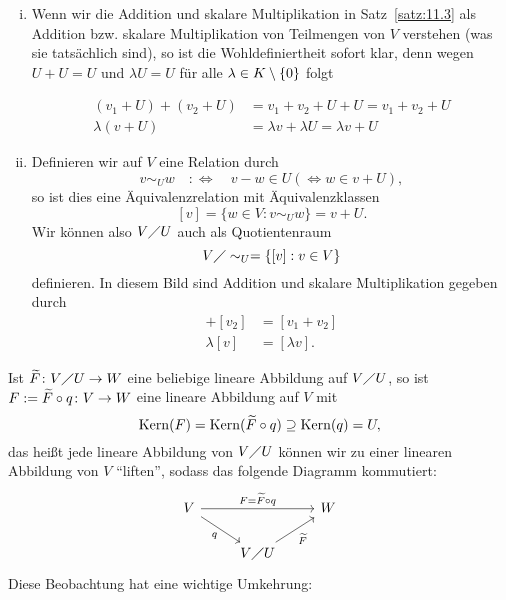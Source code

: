 \begin{bemerkung}
	\label{bem:11.4}
	\begin{enumerate}[(i)]
		\item Wenn wir die Addition und skalare Multiplikation in Satz~\ref{satz:11.3} als Addition bzw. skalare Multiplikation von Teilmengen von $V$ verstehen (was sie tatsächlich sind), so ist die Wohldefiniertheit sofort klar, denn wegen $U+U = U$ und $\lambda U = U$ für alle $\lambda \in K \setminus \{0\}$ folgt
		
		\begin{align*}
			(v_1+U)+(v_2+U) &= v_1+v_2+U+U = v_1 + v_2 + U \\
			\lambda(v+U) &= \lambda v + \lambda U = \lambda v + U
		\end{align*}
		
		\item Definieren wir auf $V$ eine Relation durch
		\[
			v \sim_U w \quad :\Leftrightarrow \quad v-w \in U (\Leftrightarrow w \in v+U),
		\]
		so ist dies eine Äquivalenzrelation mit Äquivalenzklassen 
		\[
			[v] = \{w \in V : v \sim_U w\} = v + U.
		\]
		Wir können also $V \diagup U$ auch als Quotientenraum
		\[
			V \diagup \sim_U = \{ [v] : v \in V\}
		\]
		definieren.
		In diesem Bild sind Addition und skalare Multiplikation gegeben durch
		\begin{align*}
			[v_1] + [v_2] &= [v_1 + v_2] \\
			\lambda [v] &= [\lambda v].
		\end{align*}
	\end{enumerate}
\end{bemerkung}

\begin{bemerkung}
	\label{bem:11.5}
	Ist $\widetilde{F}\colon V \diagup U \rightarrow W$ eine beliebige lineare Abbildung auf $V \diagup U$, so ist $F := \widetilde{F} \circ q \colon V \rightarrow W$ eine lineare Abbildung auf $V$ mit
	\[
		\operatorname{Kern}(F) = \operatorname{Kern}(\widetilde{F} \circ q) \supseteq \operatorname{Kern}(q) = U,
	\]
	das heißt jede lineare Abbildung von $V \diagup U$ können wir zu einer linearen Abbildung von $V$ \enquote{liften}, sodass das folgende Diagramm kommutiert:
	\[
		\begin{tikzcd}
			V \arrow[rr,"F=\wt{F} \circ q"] \arrow[rd,"q"'] & & W \\
			& V \diagup U \arrow[ru,"\wt{F}"'] &
		\end{tikzcd}
	\]
	Diese Beobachtung hat eine wichtige Umkehrung:
\end{bemerkung}


